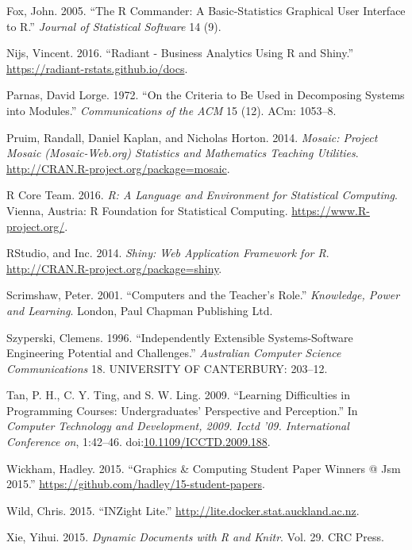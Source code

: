 \documentclass[12pt,]{article}
\begin{document}
\hypertarget{ref-fox2005}{}
Fox, John. 2005. ``The R Commander: A Basic-Statistics Graphical User
Interface to R.'' \emph{Journal of Statistical Software} 14 (9).

\hypertarget{ref-radiant}{}
Nijs, Vincent. 2016. ``Radiant - Business Analytics Using R and Shiny.''
\url{https://radiant-rstats.github.io/docs}.

\hypertarget{ref-parnas1972criteria}{}
Parnas, David Lorge. 1972. ``On the Criteria to Be Used in Decomposing
Systems into Modules.'' \emph{Communications of the ACM} 15 (12). ACm:
1053--8.

\hypertarget{ref-mosaic}{}
Pruim, Randall, Daniel Kaplan, and Nicholas Horton. 2014. \emph{Mosaic:
Project Mosaic (Mosaic-Web.org) Statistics and Mathematics Teaching
Utilities}. \url{http://CRAN.R-project.org/package=mosaic}.

\hypertarget{ref-r-stat}{}
R Core Team. 2016. \emph{R: A Language and Environment for Statistical
Computing}. Vienna, Austria: R Foundation for Statistical Computing.
\url{https://www.R-project.org/}.

\hypertarget{ref-shiny}{}
RStudio, and Inc. 2014. \emph{Shiny: Web Application Framework for R}.
\url{http://CRAN.R-project.org/package=shiny}.

\hypertarget{ref-scrimshaw2001computers}{}
Scrimshaw, Peter. 2001. ``Computers and the Teacher's Role.''
\emph{Knowledge, Power and Learning}. London, Paul Chapman Publishing
Ltd.

\hypertarget{ref-szyperski1996independently}{}
Szyperski, Clemens. 1996. ``Independently Extensible Systems-Software
Engineering Potential and Challenges.'' \emph{Australian Computer
Science Communications} 18. UNIVERSITY OF CANTERBURY: 203--12.

\hypertarget{ref-5359977}{}
Tan, P. H., C. Y. Ting, and S. W. Ling. 2009. ``Learning Difficulties in
Programming Courses: Undergraduates' Perspective and Perception.'' In
\emph{Computer Technology and Development, 2009. Icctd '09.
International Conference on}, 1:42--46.
doi:\href{https://doi.org/10.1109/ICCTD.2009.188}{10.1109/ICCTD.2009.188}.

\hypertarget{ref-interpolate}{}
Wickham, Hadley. 2015. ``Graphics \& Computing Student Paper Winners @
Jsm 2015.'' \url{https://github.com/hadley/15-student-papers}.

\hypertarget{ref-inzight}{}
Wild, Chris. 2015. ``INZight Lite.''
\url{http://lite.docker.stat.auckland.ac.nz}.

\hypertarget{ref-xie2015}{}
Xie, Yihui. 2015. \emph{Dynamic Documents with R and Knitr}. Vol. 29.
CRC Press.
\end{document}
